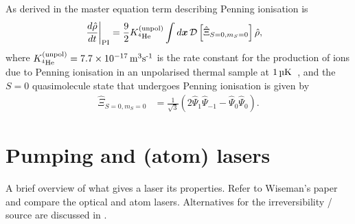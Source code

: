 As derived in  the master equation term describing Penning ionisation is
\begin{align}
    \left.\frac{d \hat{\rho}}{dt}\right|_\text{PI} &= \frac{9}{2} K^\text{(unpol)}_{^4\text{He}} \int d \bm{x}\, \mathcal{D}\left[ \hat{\Xi}_{S=0, m_S=0}\right] \hat{\rho},
\end{align}
where $\Kunpol = \unit[7.7\times 10^{-17}]{m\textsuperscript{3}s\textsuperscript{-1}}$ is the rate constant for the production of ions due to Penning ionisation in an unpolarised thermal sample at $\unit[1]{\micro K}$~\citep{Stas:2006kx}, and the $S=0$ quasimolecule state that undergoes Penning ionisation is given by
\begin{align}
    \hat{\Xi}_{S=0, m_S=0} &= \frac{1}{\sqrt{3}} \left( 2 \hat{\Psi}_1 \hat{\Psi}_{-1} - \hat{\Psi}_0 \hat{\Psi}_0\right).
\end{align}

\section{Pumping and (atom) lasers}
\label{BackgroundTheory:Lasers}
A brief overview of what gives a laser its properties. Refer to Wiseman's paper~\citep{Wiseman:1997ba} and compare the optical and atom lasers. Alternatives for the irreversibility / source are discussed in .